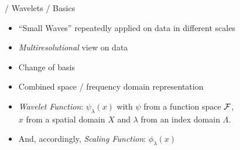 \documentclass{beamer}
\begin{document}
\begin{frame}{/ Wavelets / Basics}

  \begin{itemize}
  \item ``Small Waves'' repeatedly applied on data in different scales
  \item \emph{Multiresolutional} view on data
  \item Change of basis
  \item Combined space / frequency domain representation
  \end{itemize}

  \pause
  \begin{itemize}
  \item \emph{Wavelet Function}: $\psi_\lambda (x)$ with $\psi$ from a function
    space $\cal F$,\\
    $x$ from a spatial domain $X$ and $\lambda$ from an index domain $\Lambda$.
  \item And, accordingly, \emph{Scaling Function}:  $\phi_\lambda (x)$  
  \end{itemize}
\end{frame}
\end{document}

